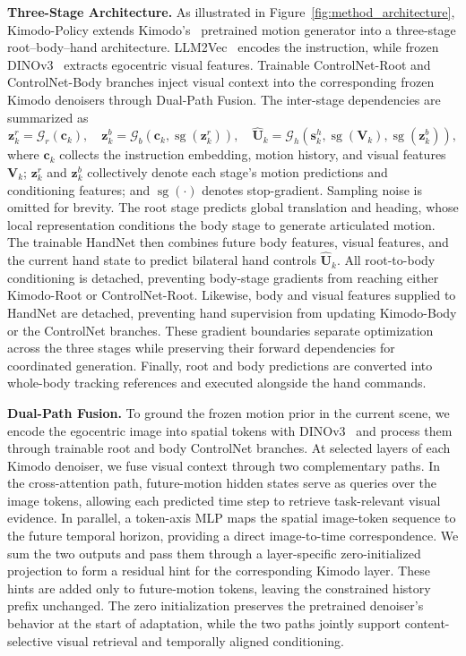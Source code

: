 \textbf{Three-Stage Architecture.}
As illustrated in Figure~\ref{fig:method_architecture}, Kimodo-Policy extends Kimodo's~\cite{kimodo} pretrained motion generator into a three-stage root--body--hand architecture.
LLM2Vec~\cite{behnamghader2024llm2veclargelanguagemodels} encodes the instruction, while frozen DINOv3~\cite{dinov3} extracts egocentric visual features.
Trainable ControlNet-Root and ControlNet-Body branches inject visual context into the corresponding frozen Kimodo denoisers through Dual-Path Fusion.
The inter-stage dependencies are summarized as
\begin{equation}
\mathbf{z}^{r}_k = \mathcal{G}_{r}(\mathbf{c}_k),
\quad
\mathbf{z}^{b}_k = \mathcal{G}_{b}\!\left(\mathbf{c}_k,\operatorname{sg}(\mathbf{z}^{r}_k)\right),
\quad
\widehat{\mathbf{U}}_k = \mathcal{G}_{h}\!\left(\mathbf{s}^{h}_k,\operatorname{sg}(\mathbf{V}_k),\operatorname{sg}(\mathbf{z}^{b}_k)\right),
\label{eq:three_stage_architecture}
\end{equation}
where $\mathbf{c}_k$ collects the instruction embedding, motion history, and visual features $\mathbf{V}_k$;
$\mathbf{z}^{r}_k$ and $\mathbf{z}^{b}_k$ collectively denote each stage's motion predictions and conditioning features;
and $\operatorname{sg}(\cdot)$ denotes stop-gradient.
Sampling noise is omitted for brevity.
The root stage predicts global translation and heading, whose local representation conditions the body stage to generate articulated motion.
The trainable HandNet then combines future body features, visual features, and the current hand state to predict bilateral hand controls $\widehat{\mathbf{U}}_k$.
All root-to-body conditioning is detached, preventing body-stage gradients from reaching either Kimodo-Root or ControlNet-Root.
Likewise, body and visual features supplied to HandNet are detached, preventing hand supervision from updating Kimodo-Body or the ControlNet branches.
These gradient boundaries separate optimization across the three stages while preserving their forward dependencies for coordinated generation.
Finally, root and body predictions are converted into whole-body tracking references and executed alongside the hand commands.

\textbf{Dual-Path Fusion.} To ground the frozen motion prior in the current scene, we encode the egocentric image into spatial tokens with DINOv3~\cite{dinov3} and process them through trainable root and body ControlNet branches. At selected layers of each Kimodo denoiser, we fuse visual context through two complementary paths. In the cross-attention path, future-motion hidden states serve as queries over the image tokens, allowing each predicted time step to retrieve task-relevant visual evidence. In parallel, a token-axis MLP maps the spatial image-token sequence to the future temporal horizon, providing a direct image-to-time correspondence. We sum the two outputs and pass them through a layer-specific zero-initialized projection to form a residual hint for the corresponding Kimodo layer. These hints are added only to future-motion tokens, leaving the constrained history prefix unchanged. The zero initialization preserves the pretrained denoiser's behavior at the start of adaptation, while the two paths jointly support content-selective visual retrieval and temporally aligned conditioning.


